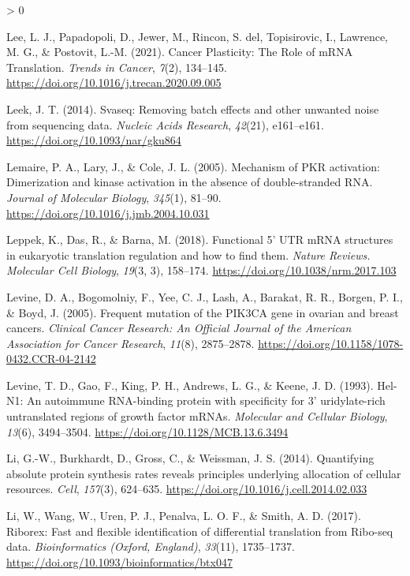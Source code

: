 \documentclass[
  12pt,
  openany]{book}
\newlength{\cslhangindent}
\newenvironment{CSLReferences}[2] %
 {%
  \setlength{\parindent}{0pt}
  \ifodd #1 \everypar{\setlength{\hangindent}{\cslhangindent}}\ignorespaces\fi
  \ifnum #2 > 0
  \setlength{\parskip}{#2\baselineskip}
  \fi
 }%
 {}
\begin{document}
\begin{CSLReferences}{1}{0}
\leavevmode\hypertarget{ref-Lee2021}{}%
Lee, L. J., Papadopoli, D., Jewer, M., Rincon, S. del, Topisirovic, I., Lawrence, M. G., \& Postovit, L.-M. (2021). Cancer {Plasticity}: {The Role} of {mRNA Translation}. \emph{Trends in Cancer}, \emph{7}(2), 134--145. \url{https://doi.org/10.1016/j.trecan.2020.09.005}

\leavevmode\hypertarget{ref-Leek2014}{}%
Leek, J. T. (2014). Svaseq: Removing batch effects and other unwanted noise from sequencing data. \emph{Nucleic Acids Research}, \emph{42}(21), e161--e161. \url{https://doi.org/10.1093/nar/gku864}

\leavevmode\hypertarget{ref-Lemaire2005}{}%
Lemaire, P. A., Lary, J., \& Cole, J. L. (2005). Mechanism of {PKR} activation: Dimerization and kinase activation in the absence of double-stranded {RNA}. \emph{Journal of Molecular Biology}, \emph{345}(1), 81--90. \url{https://doi.org/10.1016/j.jmb.2004.10.031}

\leavevmode\hypertarget{ref-Leppek2018}{}%
Leppek, K., Das, R., \& Barna, M. (2018). Functional 5' {UTR mRNA} structures in eukaryotic translation regulation and how to find them. \emph{Nature Reviews. Molecular Cell Biology}, \emph{19}(3, 3), 158--174. \url{https://doi.org/10.1038/nrm.2017.103}

\leavevmode\hypertarget{ref-Levine2005}{}%
Levine, D. A., Bogomolniy, F., Yee, C. J., Lash, A., Barakat, R. R., Borgen, P. I., \& Boyd, J. (2005). Frequent mutation of the {PIK3CA} gene in ovarian and breast cancers. \emph{Clinical Cancer Research: An Official Journal of the American Association for Cancer Research}, \emph{11}(8), 2875--2878. \url{https://doi.org/10.1158/1078-0432.CCR-04-2142}

\leavevmode\hypertarget{ref-Levine1993}{}%
Levine, T. D., Gao, F., King, P. H., Andrews, L. G., \& Keene, J. D. (1993). Hel-{N1}: An autoimmune {RNA}-binding protein with specificity for 3' uridylate-rich untranslated regions of growth factor {mRNAs}. \emph{Molecular and Cellular Biology}, \emph{13}(6), 3494--3504. \url{https://doi.org/10.1128/MCB.13.6.3494}

\leavevmode\hypertarget{ref-Li2014}{}%
Li, G.-W., Burkhardt, D., Gross, C., \& Weissman, J. S. (2014). Quantifying absolute protein synthesis rates reveals principles underlying allocation of cellular resources. \emph{Cell}, \emph{157}(3), 624--635. \url{https://doi.org/10.1016/j.cell.2014.02.033}

\leavevmode\hypertarget{ref-Li2017}{}%
Li, W., Wang, W., Uren, P. J., Penalva, L. O. F., \& Smith, A. D. (2017). Riborex: Fast and flexible identification of differential translation from {Ribo}-seq data. \emph{Bioinformatics (Oxford, England)}, \emph{33}(11), 1735--1737. \url{https://doi.org/10.1093/bioinformatics/btx047}


\end{CSLReferences}
\end{document}
